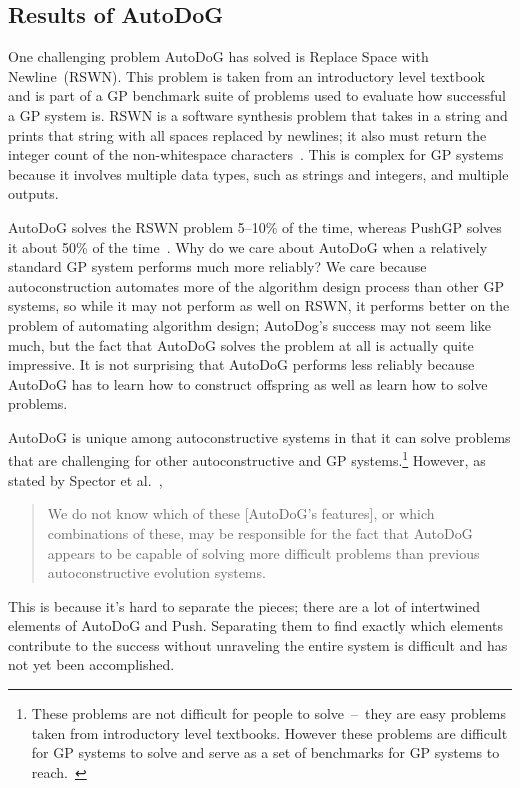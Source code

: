 \documentclass{sig-alternate}
\begin{document}
\subsection{Results of AutoDoG}
\label{sec:results}

One challenging problem AutoDoG has solved is Replace Space with Newline~(RSWN). This problem is taken from an introductory level textbook and is part of a GP benchmark suite of problems used to evaluate how successful a GP system is. RSWN is a software synthesis problem that takes in a string and prints that string with all spaces replaced by newlines; it also must return the integer count of the non-whitespace characters~\cite{helmuth:2015}. This is complex for GP systems because it involves multiple data types, such as strings and integers, and multiple outputs.

AutoDoG solves the RSWN problem 5--10\% of the time, whereas PushGP solves it about 50\% of the time~\cite{helmuth:2015}. Why do we care about AutoDoG when a relatively standard GP system performs much more reliably? We care because autoconstruction automates more of the algorithm design process than other GP systems, so while it may not perform as well on RSWN, it performs better on the problem of automating algorithm design; AutoDog's success may not seem like much, but the fact that AutoDoG solves the problem at all is actually quite impressive. It is not surprising that AutoDoG performs less reliably because AutoDoG has to learn how to construct offspring as well as learn how to solve problems.

AutoDoG is unique among autoconstructive systems in that it can solve problems that are challenging for other autoconstructive and GP systems.\footnote{These problems are not difficult for people to solve~--~they are easy problems taken from introductory level textbooks. However these problems are difficult for GP systems to solve and serve as a set of benchmarks for GP systems to reach.~\cite{helmuth:2015}} However, as stated by Spector et al.~\cite{spector:2016},
\begin{quotation}
	We do not know which of these [AutoDoG's features], or which combinations of these, may be responsible for the fact that AutoDoG appears to be capable of solving more difficult problems than previous autoconstructive evolution systems.
\end{quotation}
This is because it's hard to separate the pieces; there are a lot of intertwined elements of AutoDoG and Push. Separating them to find exactly which elements contribute to the success without unraveling the entire system is difficult and has not yet been accomplished.
\end{document}

